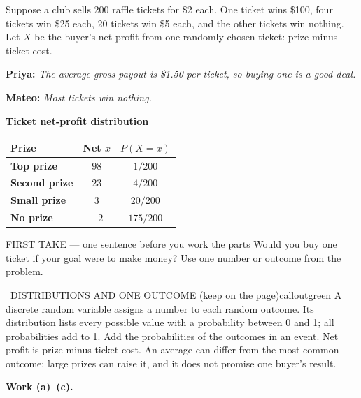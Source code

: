 \documentclass[11pt]{article}
\begin{document}


Suppose a club sells 200 raffle tickets for \$2 each. One ticket wins \$100, four tickets win \$25 each, 20 tickets win \$5 each, and the other tickets win nothing. Let $X$ be the buyer's net profit from one randomly chosen ticket: prize minus ticket cost.\par\smallskip \textbf{Priya:} \emph{The average gross payout is \$1.50 per ticket, so buying one is a good deal.}\par \textbf{Mateo:} \emph{Most tickets win nothing.}\par
\begin{center}
\textbf{Ticket net-profit distribution}\par\smallskip
\begin{tabular}{|l|c|c|}
\hline
\textbf{Prize} & \textbf{Net $x$} & \textbf{$P(X=x)$} \\ \hline
\textbf{Top prize} & $98$ & $1/200$ \\ \hline
\textbf{Second prize} & $23$ & $4/200$ \\ \hline
\textbf{Small prize} & $3$ & $20/200$ \\ \hline
\textbf{No prize} & $-2$ & $175/200$ \\ \hline
\end{tabular}
\end{center}
\begin{firsttakebox}{FIRST TAKE --- one sentence before you work the parts}
Would you buy one ticket if your goal were to make money? Use one number or outcome from the problem.
\workspace{0.9in}
\end{firsttakebox}

\begin{callout}{\IconBook\ DISTRIBUTIONS AND ONE OUTCOME (keep on the page)}{calloutgreen}
A discrete random variable assigns a number to each random outcome. Its distribution lists every possible value with a probability between 0 and 1; all probabilities add to 1. Add the probabilities of the outcomes in an event. Net profit is prize minus ticket cost. An average can differ from the most common outcome; large prizes can raise it, and it does not promise one buyer's result.
\end{callout}

\newpage
\textbf{Work (a)--(c).}\par\smallskip
\end{document}
